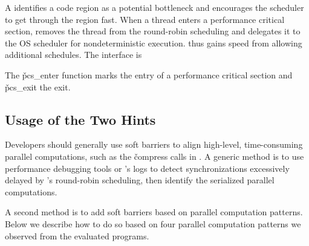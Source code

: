 A \vnondet identifies a code region as a potential bottleneck
and encourages the scheduler to get
through the region fast.  When a thread enters a performance critical
section, \parrot removes the thread from the round-robin scheduling 
and delegates it to the OS scheduler for nondeterministic execution.  \parrot thus gains speed
from allowing additional schedules.  The interface is
\vspace{-3 mm}

\vspace{-1 mm}

\noindent
The \v{pcs\_enter} function marks the entry of a performance critical section and
\v{pcs\_exit} the exit.

\subsection{Usage of the Two Hints} \label{sec:parrot-hints-usage}

 Developers should generally use soft barriers to align
high-level, time-consuming parallel computations, such as the \v{compress}
calls in \pbzip. A generic method is to use performance debugging tools or
\parrot's logs to detect synchronizations excessively delayed by \parrot's
round-robin scheduling, then identify the serialized parallel computations.

A second method is to add soft barriers based on parallel computation
patterns.  Below we describe how to do so based on four parallel
computation patterns we observed from the \nprog evaluated programs.

